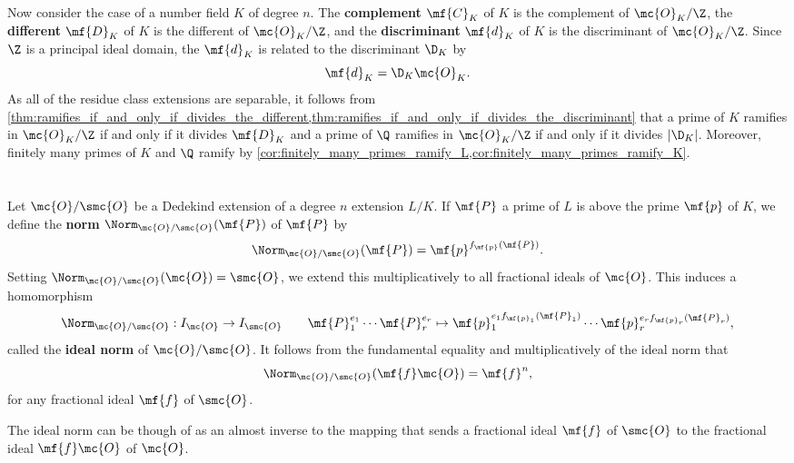     Now consider the case of a number field \(K\) of degree \(n\). The \textbf{complement} \(\mf{C}_{K}\) of \(K\) is the complement of \(\mc{O}_{K}/\Z\), the \textbf{different} \(\mf{D}_{K}\) of \(K\) is the different of \(\mc{O}_{K}/\Z\), and the \textbf{discriminant} \(\mf{d}_{K}\) of \(K\) is the discriminant of \(\mc{O}_{K}/\Z\). Since \(\Z\) is a principal ideal domain, the \(\mf{d}_{K}\) is related to the discriminant \(\D_{K}\) by
    \[
      \mf{d}_{K} = \D_{K}\mc{O}_{K}.
    \]
    As all of the residue class extensions are separable, it follows from \cref{thm:ramifies_if_and_only_if_divides_the_different,thm:ramifies_if_and_only_if_divides_the_discriminant} that a prime of \(K\) ramifies in \(\mc{O}_{K}/\Z\) if and only if it divides \(\mf{D}_{K}\) and a prime of \(\Q\) ramifies in \(\mc{O}_{K}/\Z\) if and only if it divides \(|\D_{K}|\). Moreover, finitely many primes of \(K\) and \(\Q\) ramify by \cref{cor:finitely_many_primes_ramify_L,cor:finitely_many_primes_ramify_K}.
  \fi\iffalse\section{}
    Let \(\mc{O}/\smc{O}\) be a Dedekind extension of a degree \(n\) extension \(L/K\). If \(\mf{P}\) a prime of \(L\) is above the prime \(\mf{p}\) of \(K\), we define the \textbf{norm} \(\Norm_{\mc{O}/\smc{O}}(\mf{P})\) of \(\mf{P}\) by
    \[
      \Norm_{\mc{O}/\smc{O}}(\mf{P}) = \mf{p}^{f_{\mf{p}}(\mf{P})}.
    \]
    Setting \(\Norm_{\mc{O}/\smc{O}}(\mc{O}) = \smc{O}\), we extend this multiplicatively to all fractional ideals of \(\mc{O}\). This induces a homomorphism
    \[
      \Norm_{\mc{O}/\smc{O}}:I_{\mc{O}} \to I_{\smc{O}} \qquad \mf{P}_{1}^{e_{1}} \cdots \mf{P}_{r}^{e_{r}} \mapsto \mf{p}_{1}^{e_{1}f_{\mf{p}_{1}}(\mf{P}_{1})} \cdots \mf{p}_{r}^{e_{r}f_{\mf{p}_{r}}(\mf{P}_{r})},
    \]
    called the \textbf{ideal norm} of \(\mc{O}/\smc{O}\). It follows from the fundamental equality and multiplicatively of the ideal norm that
    \[
      \Norm_{\mc{O}/\smc{O}}(\mf{f}\mc{O}) = \mf{f}^{n},
    \]
    for any fractional ideal \(\mf{f}\) of \(\smc{O}\). 

    \begin{remark}
      The ideal norm can be though of as an almost inverse to the mapping that sends a fractional ideal \(\mf{f}\) of \(\smc{O}\) to the fractional ideal \(\mf{f}\mc{O}\) of \(\mc{O}\).
    \end{remark}


